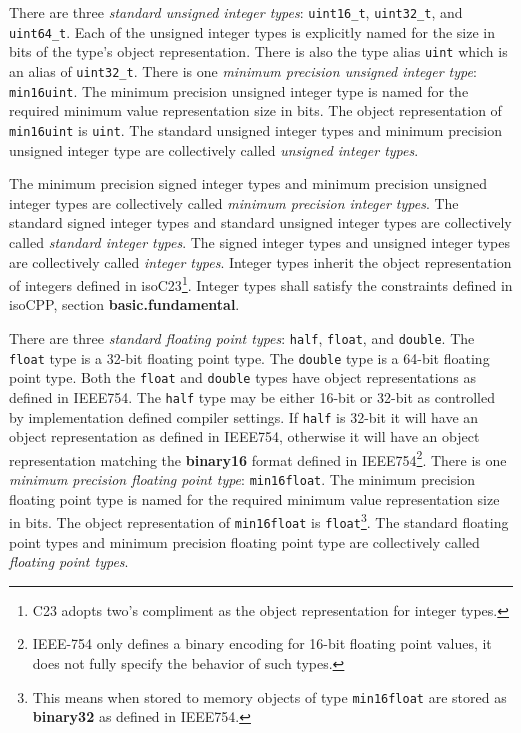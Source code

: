 \p There are three \textit{standard unsigned integer types}: \texttt{uint16\_t},
\texttt{uint32\_t}, and \texttt{uint64\_t}. Each of the unsigned integer types
is explicitly named for the size in bits of the type's object representation.
There is also the type alias \texttt{uint} which is an alias of
\texttt{uint32\_t}. There is one \textit{minimum precision unsigned integer
type}: \texttt{min16uint}. The minimum precision unsigned integer type is named
for the required minimum value representation size in bits. The object
representation of \texttt{min16uint} is \texttt{uint}. The standard unsigned
integer types and minimum precision unsigned integer type are collectively
called \textit{unsigned integer types}.

\p The minimum precision signed integer types and minimum precision unsigned
integer types are collectively called \textit{minimum precision integer types}.
The standard signed integer types and standard unsigned integer types are
collectively called \textit{standard integer types}. The signed integer types
and unsigned integer types are collectively called \textit{integer types}.
Integer types inherit the object representation of integers defined in
\glsdesc{isoC23}\footnote{C23 adopts two's compliment as the object
representation for integer types.}. Integer types shall satisfy the constraints
defined in \glsdesc{isoCPP}, section \textbf{basic.fundamental}.

\p There are three \textit{standard floating point types}: \texttt{half},
\texttt{float}, and \texttt{double}. The \texttt{float} type is a 32-bit
floating point type. The \texttt{double} type is a 64-bit floating point type.
Both the \texttt{float} and \texttt{double} types have object representations as
defined in \gls{IEEE754}. The \texttt{half} type may be either 16-bit or 32-bit
as controlled by implementation defined compiler settings. If \texttt{half} is
32-bit it will have an object representation as defined in \gls{IEEE754},
otherwise it will have an object representation matching the \textbf{binary16}
format defined in \gls{IEEE754}\footnote{IEEE-754 only defines a binary encoding
for 16-bit floating point values, it does not fully specify the behavior of such
types.}. There is one \textit{minimum precision floating point type}:
\texttt{min16float}. The minimum precision floating point type is named for the
required minimum value representation size in bits. The object representation of
\texttt{min16float} is \texttt{float}\footnote{This means when stored to memory
objects of type \texttt{min16float} are stored as \textbf{binary32} as defined
in \gls{IEEE754}.}. The standard floating point types and minimum precision
floating point type are collectively called \textit{floating point types}.

